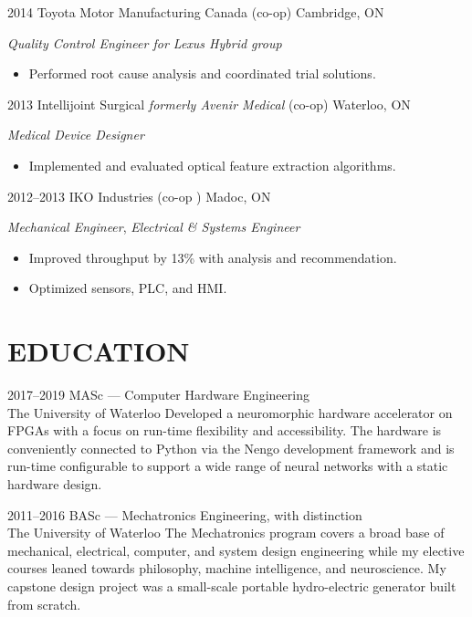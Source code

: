 \documentclass[a4paper,nocolors]{cv-friggeri-ben}
\begin{document}
\begin{entrylist}
\entry
    {2014}
    {Toyota Motor Manufacturing Canada {\normalfont (co-op)}}
    {Cambridge, ON}
    {\emph{Quality Control Engineer for Lexus Hybrid group}
    \begin{itemize}
        \item Performed root cause analysis and coordinated trial solutions.
    \end{itemize}}

\entry
    {2013}
    {Intellijoint Surgical {\normalfont \emph{formerly Avenir Medical} (co-op)}}
    {Waterloo, ON}
    {\emph{Medical Device Designer}
    \begin{itemize}
        \item Implemented and evaluated optical feature extraction algorithms.
    \end{itemize}}

\entry
    {2012--2013}
    {IKO Industries {\normalfont (co-op )}}
    {Madoc, ON}
    {\emph{Mechanical Engineer}, \emph{Electrical \& Systems Engineer}
    \begin{itemize}
        \item Improved throughput by 13\% with analysis and recommendation.
        \item Optimized sensors, PLC, and HMI.
    \end{itemize}
    }
\end{entrylist}


\pagebreak

\section{EDUCATION}

\begin{entrylist}

\entry
    {2017--2019}
    {MASc {\normalfont --- Computer Hardware Engineering}}
    {\\The University of Waterloo}
    {Developed a neuromorphic hardware accelerator on FPGAs with a focus on
    run-time flexibility and accessibility. The hardware is conveniently
    connected to Python via the Nengo development framework and is run-time
    configurable to support a wide range of neural networks with a static
    hardware design.}

\entry
    {2011--2016}
    {BASc {\normalfont --- Mechatronics Engineering, with distinction}}
    {\\The University of Waterloo}
    {The Mechatronics program covers a broad base of mechanical, electrical,
    computer, and system design engineering while my elective courses leaned
    towards philosophy, machine intelligence, and neuroscience. My capstone
    design project was a small-scale portable hydro-electric generator built
    from scratch.}

\end{entrylist}
\end{document}
